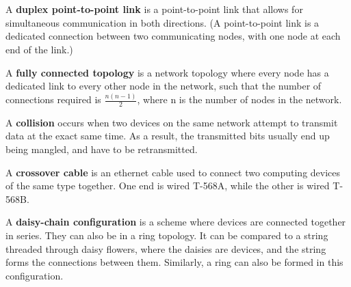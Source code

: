 \section{}
A \textbf{duplex point-to-point link} is a point-to-point link that allows for
simultaneous communication in both directions. (A point-to-point link is a
dedicated connection between two communicating nodes, with one node at each end
of the link.)


A \textbf{fully connected topology} is a network topology where every node has a
dedicated link to every other node in the network, such that the number of
connections required is \(\frac{n(n-1)}{2}\), where n is the number of nodes in
the network.

A \textbf{collision} occurs when two devices on the same network attempt to
transmit data at the exact same time. As a result, the transmitted bits usually
end up being mangled, and have to be retransmitted.


A \textbf{crossover cable} is an ethernet cable used to connect two computing
devices of the same type together. One end is wired T-568A, while the other is
wired T-568B.


A \textbf{daisy-chain configuration} is a scheme where devices are connected
together in series. They can also be in a ring topology. It can be compared to a
string threaded through daisy flowers, where the daisies are devices, and the
string forms the connections between them. Similarly, a ring can also be formed
in this configuration.
